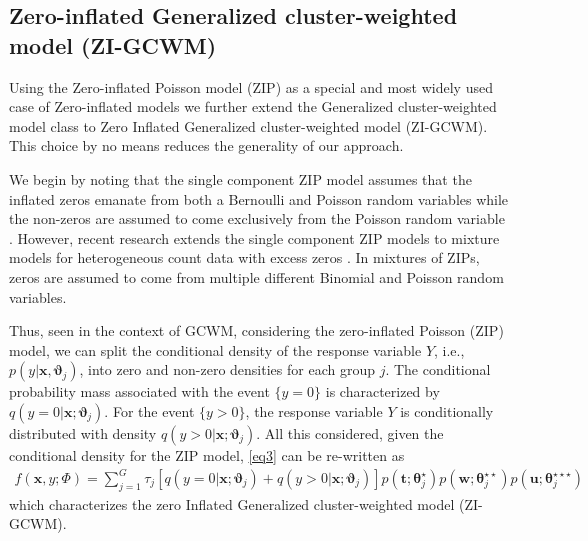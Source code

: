 \documentclass[12pt,letterpaper]{article}
\numberwithin{equation}{section}
\numberwithin{equation}{section}
\numberwithin{equation}{section}
\begin{document}

\subsection{Zero-inflated Generalized cluster-weighted model (ZI-GCWM)}%

Using the Zero-inflated Poisson model (ZIP) as a special and most widely used case of Zero-inflated models we further extend the Generalized cluster-weighted model class to Zero Inflated Generalized cluster-weighted model (ZI-GCWM). This choice by no means reduces the generality of our approach. 

We begin by noting that the single component ZIP model assumes that the inflated zeros emanate from both a Bernoulli and Poisson random variables while the non-zeros are assumed to come exclusively from the Poisson random variable  \citep[see][]{Lambert}. However, recent research  extends the single component ZIP models to mixture models for heterogeneous count data with excess zeros \citep[see][]{Bermudez+Karlis:2012}. In mixtures of ZIPs, zeros are assumed to come from multiple different Binomial and Poisson random variables. 

Thus, seen in the context of GCWM, considering the zero-inflated Poisson (ZIP) model, we can split the conditional density of the response variable $Y$, i.e., $p(y|\bm{x},\bm{\vartheta}_j)$, into zero and non-zero densities for each group $j$. The conditional probability mass associated with the event $\{y=0\}$ is characterized by $q(y = 0|\bm{x};\bm{\vartheta}_{j})$. For the event $\{y > 0\}$, the response variable $Y$ is conditionally distributed with density $q(y > 0|\bm{x}; \bm{\vartheta}_{j} )$. All this considered, given the conditional density for the ZIP model, \eqref{eq3} can be re-written as
 \begin{align}
 f(\bm x, y; \Phi)= \sum_{j=1}^{G} \tau_j \left[ q(y = 0|\bm{x};\bm{\vartheta}_{j} ) +  q(y > 0|\bm{x} ; \bm{\vartheta}_{j}  ) \right]   p(\bm{t};\bm{\theta}_j^{\star})p(\bm{w};\bm{\theta}_j^{\star\star})p(\bm{u};\bm{\theta}_j^{\star\star\star})
\end{align}
which characterizes the zero Inflated Generalized cluster-weighted model (ZI-GCWM).
\end{document}
